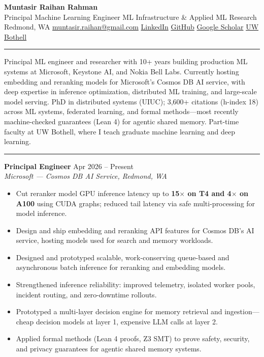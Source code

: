 \documentclass[11pt]{article}
\newcommand{\cvsec}[1]{\vspace{8pt}{\large\bfseries #1}\vspace{2pt}\hrule\vspace{4pt}\par}
\newcommand{\role}[4]{\textbf{#1} \hfill #4\\ \textit{#2, #3}\vspace{2pt}}
\begin{document}
\begin{center}
{\LARGE \textbf{Muntasir Raihan Rahman}}\\[3pt]
Principal Machine Learning Engineer \textbar{} ML Infrastructure \& Applied ML Research\\[2pt]
Redmond, WA \textbar{} \href{mailto:muntasir.raihan@gmail.com}{muntasir.raihan@gmail.com} \textbar{} \href{https://www.linkedin.com/in/muntasir-raihan-rahman-69915a12}{LinkedIn} \textbar{} \href{https://github.com/mrrahman1517}{GitHub} \textbar{} \href{https://scholar.google.com/citations?user=Z3hzieoAAAAJ}{Google Scholar} \textbar{} \href{https://www.uwb.edu/faculty/muntasir-rahman/}{UW Bothell}
\end{center}

\cvsec{Summary}
Principal ML engineer and researcher with 10+ years building production ML systems at Microsoft, Keystone AI, and Nokia Bell Labs. Currently hosting embedding and reranking models for Microsoft's Cosmos DB AI service, with deep expertise in inference optimization, distributed ML training, and large-scale model serving. PhD in distributed systems (UIUC); 3,600+ citations (h-index 18) across ML systems, federated learning, and formal methods---most recently machine-checked guarantees (Lean 4) for agentic shared memory. Part-time faculty at UW Bothell, where I teach graduate machine learning and deep learning.

\cvsec{Experience}

\role{Principal Engineer}{Microsoft --- Cosmos DB AI Service}{Redmond, WA}{Apr 2026 -- Present}
\begin{itemize}[leftmargin=14pt, itemsep=1pt, topsep=2pt]
\item Cut reranker model GPU inference latency up to \textbf{15$\times$ on T4 and 4$\times$ on A100} using CUDA graphs; reduced tail latency via safe multi-processing for model inference.
\item Design and ship embedding and reranking API features for Cosmos DB's AI service, hosting models used for search and memory workloads.
\item Designed and prototyped scalable, work-conserving queue-based and asynchronous batch inference for reranking and embedding models.
\item Strengthened inference reliability: improved telemetry, isolated worker pools, incident routing, and zero-downtime rollouts.
\item Prototyped a multi-layer decision engine for memory retrieval and ingestion---cheap decision models at layer 1, expensive LLM calls at layer 2.
\item Applied formal methods (Lean 4 proofs, Z3 SMT) to prove safety, security, and privacy guarantees for agentic shared memory systems.
\end{itemize}
\end{document}
